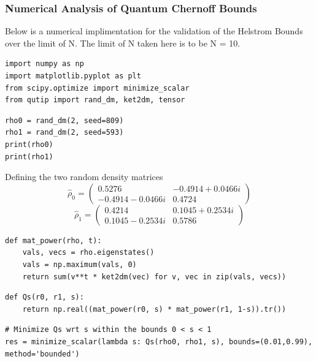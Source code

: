 \subsubsection{Numerical Analysis of Quantum Chernoff Bounds}
Below is a numerical implimentation for the validation of the Helstrom Bounds over the limit of N. The limit of N taken here is to be N = 10.

\begin{lstlisting}[style=pythonstyle, caption={Includes}]
import numpy as np
import matplotlib.pyplot as plt
from scipy.optimize import minimize_scalar
from qutip import rand_dm, ket2dm, tensor
\end{lstlisting}

\begin{lstlisting}[style=pythonstyle, caption={Defining the two state with random density matrix}]
rho0 = rand_dm(2, seed=809)
rho1 = rand_dm(2, seed=593)
print(rho0)
print(rho1)
\end{lstlisting}
Defining the two random density matrices 
$$
\hat{\rho}_0 = \begin{pmatrix}
0.5276 & -0.4914 + 0.0466i \\
-0.4914 - 0.0466i & 0.4724
\end{pmatrix}
$$
$$
\hat{\rho}_1 = \begin{pmatrix}
0.4214 & 0.1045 + 0.2534i \\
0.1045 - 0.2534i & 0.5786
\end{pmatrix}
$$

\begin{lstlisting}[style=pythonstyle, caption={Defining a function to calculate the matrix power of rho}]
def mat_power(rho, t):
    vals, vecs = rho.eigenstates()
    vals = np.maximum(vals, 0)
    return sum(v**t * ket2dm(vec) for v, vec in zip(vals, vecs))
\end{lstlisting}

\begin{lstlisting}[style=pythonstyle, caption={Defining a function to return the Qs}]
def Qs(r0, r1, s):
    return np.real((mat_power(r0, s) * mat_power(r1, 1-s)).tr())
\end{lstlisting}

\begin{lstlisting}[style=pythonstyle, caption={Gaussian state discrimination with QuTiP: Helstrom bound and Quantum Chernoff bound}]
# Minimize Qs wrt s within the bounds 0 < s < 1
res = minimize_scalar(lambda s: Qs(rho0, rho1, s), bounds=(0.01,0.99), method='bounded')
\end{lstlisting}


